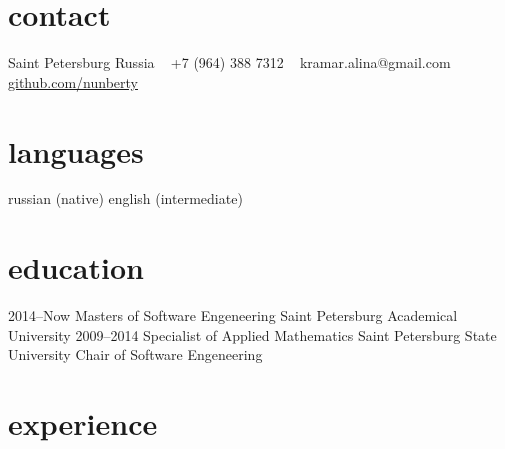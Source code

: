 \documentclass[]{friggeri-cv} %
\begin{document}


\begin{aside} %
\section{contact}
Saint Petersburg
Russia
~
+7 (964) 388 7312
~
kramar.alina@gmail.com
\href{https://github.com/nunberty}{github.com/nunberty}
\section{languages}
russian (native)
english (intermediate)
\end{aside}

\section{education}

\begin{entrylist}
\entry
{2014--Now}
{Masters {\normalfont of Software Engeneering}}
{Saint Petersburg Academical University}
{}
\entry
{2009--2014}
{Specialist {\normalfont of Applied Mathematics}}
{Saint Petersburg State University}
{Chair of Software Engeneering}
\end{entrylist}

\section{experience}
\end{document}
